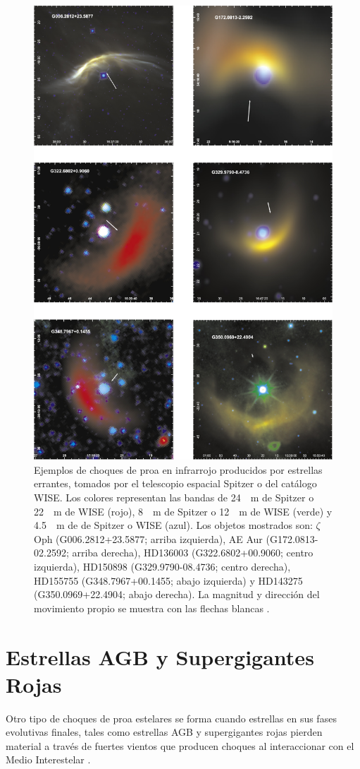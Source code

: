 \begin{figure}
  \centering
  \includegraphics[width=0.7\linewidth]{./Figures/kobulnicky}
  \caption{Ejemplos de choques de proa en infrarrojo producidos por estrellas errantes, tomados por el telescopio espacial Spitzer o del catálogo WISE. Los colores representan las bandas de \SI{24}{\mu.m} de Spitzer o \SI{22}{\mu.m} de WISE (rojo), \SI{8}{\mu.m} de Spitzer o \SI{12}{\mu.m} de WISE (verde) y \SI{4.5}{\mu.m} de de Spitzer o WISE (azul). Los objetos mostrados son: $\zeta$\, Oph (G006.2812+23.5877; arriba izquierda), AE Aur (G172.0813-02.2592; arriba derecha), HD136003 (G322.6802+00.9060; centro izquierda), HD150898 (G329.9790-08.4736; centro derecha), HD155755 (G348.7967+00.1455; abajo izquierda) y HD143275 (G350.0969+22.4904; abajo derecha). La magnitud y dirección del movimiento propio se muestra con las flechas blancas \citep{Kobulnicky:2016}.}
  \label{fig:runaway}
\end{figure}

\section{Estrellas AGB y Supergigantes Rojas}
\label{sec:AGBs}
Otro tipo de choques de proa estelares se forma cuando estrellas en sus fases evolutivas finales, tales como estrellas AGB y supergigantes rojas pierden material a través de fuertes vientos que producen choques al interaccionar con el Medio Interestelar \citep{Cox:2012}.

